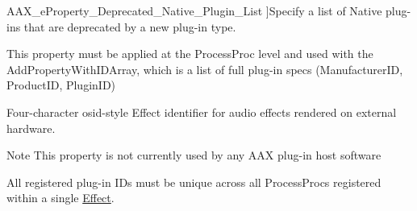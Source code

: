 \begin{Desc}
\begin{description}
{\hypertarget{a00283_a6571f4e41a5dd06e4067249228e2249ea3f1e690c987d601001a7cc1da8247399}{}A\+A\+X\+\_\+e\+Property\+\_\+\+Deprecated\+\_\+\+Native\+\_\+\+Plugin\+\_\+\+List\label{a00283_a6571f4e41a5dd06e4067249228e2249ea3f1e690c987d601001a7cc1da8247399}
}]Specify a list of Native plug-\/ins that are deprecated by a new plug-\/in type. \begin{DoxyItemize}
\item This property must be applied at the Process\+Proc level and used with the Add\+Property\+With\+I\+D\+Array, which is a list of full plug-\/in specs (Manufacturer\+I\+D, Product\+I\+D, Plugin\+I\+D) \end{DoxyItemize}
\item[{\em 
\hypertarget{a00283_a6571f4e41a5dd06e4067249228e2249ea2816852168f862575c687d28b48d0581}{}A\+A\+X\+\_\+e\+Property\+\_\+\+Plug\+In\+I\+D\+\_\+\+External\+Processor\label{a00283_a6571f4e41a5dd06e4067249228e2249ea2816852168f862575c687d28b48d0581}
}]Four-\/character osid-\/style Effect identifier for audio effects rendered on external hardware. \begin{DoxyNote}{Note}
This property is not currently used by any A\+A\+X plug-\/in host software
\end{DoxyNote}
All registered plug-\/in I\+Ds must be unique across all Process\+Procs registered within a single \hyperlink{a00096}{Effect}.


\end{description}
\end{Desc}
